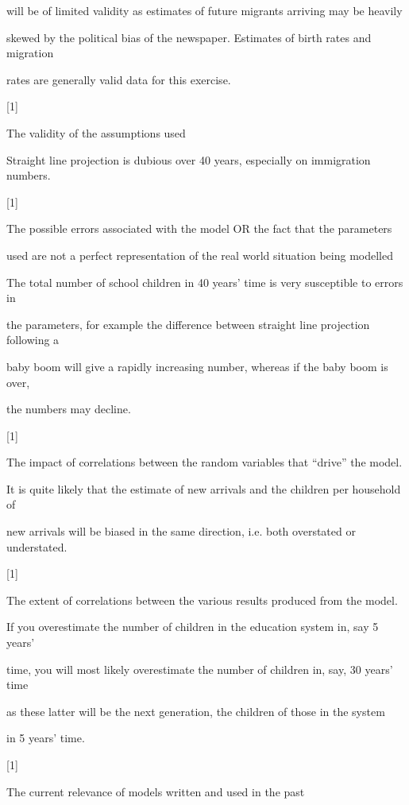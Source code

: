 \documentclass[a4paper,12pt]{article}
\begin{document}
will be of limited validity as estimates of future migrants arriving may be heavily

skewed by the political bias of the newspaper. Estimates of birth rates and migration

rates are generally valid data for this exercise.

[1]


The validity of the assumptions used

Straight line projection is dubious over 40 years, especially on immigration numbers.

[1]

The possible errors associated with the model OR the fact that the parameters

used are not a perfect representation of the real world situation being modelled

The total number of school children in 40 years’ time is very susceptible to errors in

the parameters, for example the difference between straight line projection following a

baby boom will give a rapidly increasing number, whereas if the baby boom is over,

the numbers may decline.

[1]

The impact of correlations between the random variables that “drive” the model.

It is quite likely that the estimate of new arrivals and the children per household of

new arrivals will be biased in the same direction, i.e. both overstated or understated.

[1]

The extent of correlations between the various results produced from the model.

If you overestimate the number of children in the education system in, say 5 years’

time, you will most likely overestimate the number of children in, say, 30 years’ time

as these latter will be the next generation, the children of those in the system

in 5 years’ time.

[1]

The current relevance of models written and used in the past
\end{document}
